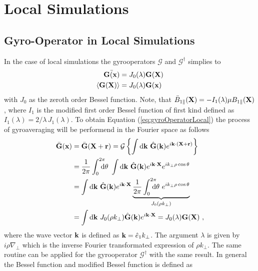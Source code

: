 \section{Local Simulations}
\label{sec:localSimulation}

\subsection{Gyro-Operator in Local Simulations}
\label{sub:gyroOperatorLocal}

In the case of local simulations the gyrooperators $\mathcal{G}$ and $\mathcal{G}^\dagger$ simplies to
\begin{gather}
    \begin{aligned}
        \bar{\boldsymbol{\mathbf{G}}(\boldsymbol{\mathbf{x}})} &= J_0(\lambda) \boldsymbol{\mathbf{G}}(\boldsymbol{\mathbf{X}}) \\
        \langle\boldsymbol{\mathbf{G}}(\boldsymbol{\mathbf{X}})\rangle &= J_0(\lambda) \boldsymbol{\mathbf{G}}(\boldsymbol{\mathbf{x}})
    \end{aligned}
    \label{eq:gyroOperatorLocal}
\end{gather}
with $J_0$ as the zeroth order Bessel function. Note, that $\bar{B}_{1\parallel}(\boldsymbol{\mathbf{X}}) = - I_1(\lambda)\mu B_{1\parallel} (\boldsymbol{\mathbf{X}})$, where $I_1$ is the modified first order Bessel function of first kind defined as $I_1(\lambda) = 2/\lambda \, J_1(\lambda)$. To obtain Equation (\ref{eq:gyroOperatorLocal}) the process of gyroaveraging will be performend in the Fourier space as follows
\begin{gather}
    \begin{aligned}
        \ga{\vect{G}}(\x) &= \ga{\vect{G}}(\X + \vect{r}) = \tga{\left\{\int \mathrm{d}\vect{k} ~ \hat{\vect{G}}(\vect{k}) e^{i \vect{k} \cdot (\X + \vect{r})} \right\}} \\
                                     &= \frac{1}{2\pi} \intss{0}{2\pi} \dtheta ~ \int \mathrm{d}\vect{k} ~ \hat{\vect{G}}(\vect{k}) e^{i \vect{k} \cdot \X} e^{ i k_\perp \rho \cos \theta} \\
                                     &= \int \mathrm{d}\vect{k} ~ \hat{\vect{G}}(\vect{k}) e^{i \vect{k} \cdot \X} \underbrace{\frac{1}{2\pi} \intss{0}{2\pi} \dtheta ~ e^{ i k_\perp \rho \cos \theta}}_{J_0(\rho k_\perp)}\\
                                     &= \int \mathrm{d}\vect{k} ~ J_0(\rho k_\perp) \hat{\vect{G}}(\vect{k}) e^{i \vect{k} \cdot \X} = J_0(\lambda) \vect{G}(\X)~,
    \end{aligned}
    \label{eq:gyroOperatorLocalDerivation}
\end{gather}
where the wave vector $\boldsymbol{\mathbf{k}}$ is defined as $\boldsymbol{\mathbf{k}} = \hat{e}_1 k_\perp$. The argument $\lambda$ is given by $i \rho \nabla_{\!\perp}$ which is the inverse Fourier transformated expression of $\rho k_\perp$. The same routine can be applied for the gyrooperator $\mathcal{G}^\dagger$ with the same result. In general the Bessel function and modified Bessel function is defined as \cite{Dannert_PHD}
